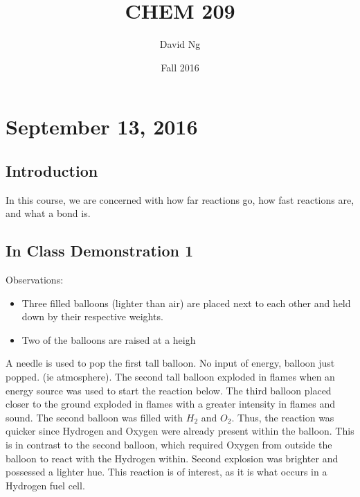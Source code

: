 \documentclass[11pt]{article}
\theoremstyle{plain} %
\theoremstyle{definition}
\theoremstyle{example}
\theoremstyle{remark}
\begin{document}
\title{CHEM 209}
\author{David Ng}
\date{Fall 2016}
\maketitle

\tableofcontents

\eject


\section{September 13, 2016}

\subsection{Introduction}                 

In this course, we are concerned with how far reactions go, how fast reactions are, and what a bond is. 

\subsection{In Class Demonstration 1}

Observations:

\begin{itemize}
	\item Three filled balloons (lighter than air) are placed next to each other and held down by their respective weights.
	\item Two of the balloons are raised at a heigh
\end{itemize}

A needle is used to pop the first tall balloon. No input of energy, balloon just popped. (ie atmosphere).  The second tall balloon exploded in flames when an energy source was used to start the reaction below. The third balloon placed closer to the ground exploded in flames with a greater intensity in flames and sound. The second balloon was filled with $H_2$ and $O_2$. Thus, the reaction was quicker since Hydrogen and Oxygen were already present within the balloon. This is in contrast to the second balloon, which required Oxygen from outside the balloon to react with the Hydrogen within. Second explosion was brighter and possessed a lighter hue. This reaction is of interest, as it is what occurs in a Hydrogen fuel cell. 
\end{document}
